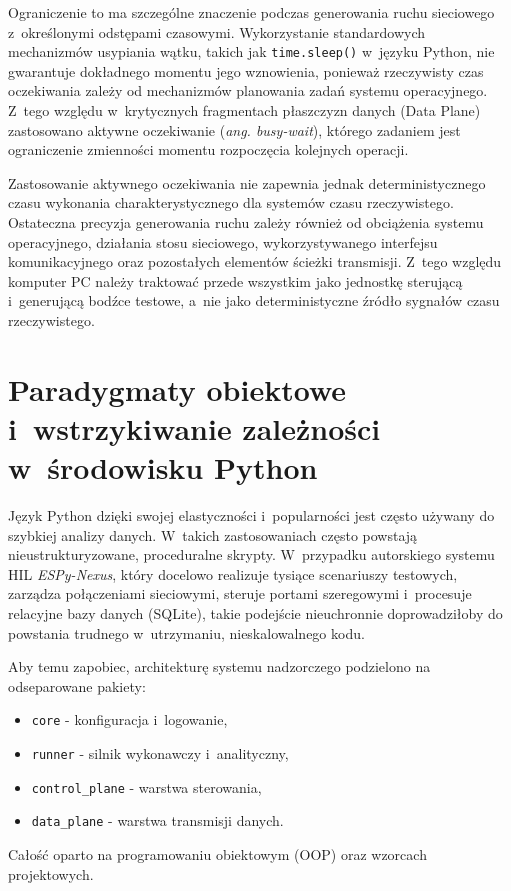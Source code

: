 Ograniczenie to ma szczególne znaczenie podczas generowania ruchu sieciowego z~określonymi odstępami czasowymi.
Wykorzystanie standardowych mechanizmów usypiania wątku, takich jak \texttt{time.sleep()} w~języku Python, nie gwarantuje dokładnego momentu jego wznowienia, ponieważ rzeczywisty czas oczekiwania zależy od mechanizmów planowania zadań systemu operacyjnego.
Z~tego względu w~krytycznych fragmentach płaszczyzn danych (Data Plane) zastosowano aktywne oczekiwanie (\textit{ang. busy-wait}), którego zadaniem jest ograniczenie zmienności momentu rozpoczęcia kolejnych operacji.

Zastosowanie aktywnego oczekiwania nie zapewnia jednak deterministycznego czasu wykonania charakterystycznego dla systemów czasu rzeczywistego.
Ostateczna precyzja generowania ruchu zależy również od obciążenia systemu operacyjnego, działania stosu sieciowego, wykorzystywanego interfejsu komunikacyjnego oraz pozostałych elementów ścieżki transmisji.
Z~tego względu komputer PC należy traktować przede wszystkim jako jednostkę sterującą i~generującą bodźce testowe, a~nie jako deterministyczne źródło sygnałów czasu rzeczywistego.

\section{Paradygmaty obiektowe i~wstrzykiwanie zależności w~środowisku Python}
\label{sec:python_architektura_oop}

Język Python dzięki swojej elastyczności i~popularności jest często używany do szybkiej analizy danych.
W~takich zastosowaniach często powstają nieustrukturyzowane, proceduralne skrypty.
W~przypadku autorskiego systemu HIL \textit{ESPy-Nexus}, który docelowo realizuje tysiące scenariuszy testowych, zarządza połączeniami sieciowymi, steruje portami szeregowymi i~procesuje relacyjne bazy danych (SQLite), takie podejście nieuchronnie doprowadziłoby do powstania trudnego w~utrzymaniu, nieskalowalnego kodu.

Aby temu zapobiec, architekturę systemu nadzorczego podzielono na odseparowane pakiety:
\begin{itemize}
    \item \texttt{core} - konfiguracja i~logowanie,
    \item \texttt{runner} - silnik wykonawczy i~analityczny,
    \item \texttt{control\_plane} - warstwa sterowania,
    \item \texttt{data\_plane} - warstwa transmisji danych.
\end{itemize}
Całość oparto na programowaniu obiektowym (OOP) oraz wzorcach projektowych.

